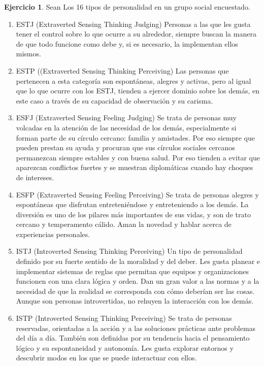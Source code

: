 \documentclass[
  10pt,
]{krantz}
\theoremstyle{definition}
\theoremstyle{definition}
\theoremstyle{definition}
\newtheorem{exercise}{Ejercicio}[chapter]
\theoremstyle{definition}
\theoremstyle{remark}
\begin{document}
\begin{exercise}
\protect\hypertarget{exr:unnamed-chunk-1}{}{\label{exr:unnamed-chunk-1} }Sean Los 16 tipos de personalidad en un grupo social encuestado.

\begin{enumerate}
\def\labelenumi{\arabic{enumi}.}
\item
  ESTJ (Extraverted Sensing Thinking Judging)
  Personas a las que les gusta tener el control sobre lo que ocurre a su alrededor, siempre buscan la manera de que todo funcione como debe y, si es necesario, la implementan ellos mismos.
\item
  ESTP ((Extraverted Sensing Thinking Perceiving)
  Las personas que pertenecen a esta categoría son espontáneas, alegres y activas, pero al igual que lo que ocurre con los ESTJ, tienden a ejercer dominio sobre los demás, en este caso a través de su capacidad de observación y su carisma.
\item
  ESFJ (Extraverted Sensing Feeling Judging)
  Se trata de personas muy volcadas en la atención de las necesidad de los demás, especialmente si forman parte de su círculo cercano: familia y amistades. Por eso siempre que pueden prestan su ayuda y procuran que sus círculos sociales cercanos permanezcan siempre estables y con buena salud. Por eso tienden a evitar que aparezcan conflictos fuertes y se muestran diplomáticas cuando hay choques de intereses.
\item
  ESFP (Extraverted Sensing Feeling Perceiving)
  Se trata de personas alegres y espontáneas que disfrutan entreteniéndose y entreteniendo a los demás. La diversión es uno de los pilares más importantes de sus vidas, y son de trato cercano y temperamento cálido. Aman la novedad y hablar acerca de experiencias personales.
\item
  ISTJ (Introverted Sensing Thinking Perceiving)
  Un tipo de personalidad definido por su fuerte sentido de la moralidad y del deber. Les gusta planear e implementar sistemas de reglas que permitan que equipos y organizaciones funcionen con una clara lógica y orden. Dan un gran valor a las normas y a la necesidad de que la realidad se corresponda con cómo deberían ser las cosas. Aunque son personas introvertidas, no rehuyen la interacción con los demás.
\item
  ISTP (Introverted Sensing Thinking Perceiving)
  Se trata de personas reservadas, orientadas a la acción y a las soluciones prácticas ante problemas del día a día. También son definidas por su tendencia hacia el pensamiento lógico y su espontaneidad y autonomía. Les gusta explorar entornos y descubrir modos en los que se puede interactuar con ellos.

\end{enumerate}
\end{exercise}
\end{document}
